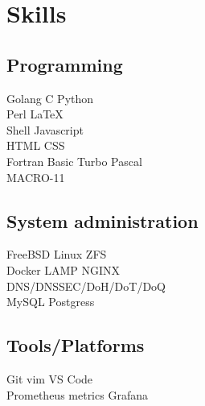 \documentclass[]{schorscv}
\begin{document}
\begin{minipage}[t]{0.25\textwidth} 


\section{Skills}
\subsection{Programming}
\sectionsep
{}
Golang \textbullet{} C \textbullet{} Python \\
\sectionsep
{}
Perl \textbullet{} \LaTeX\  \\
\sectionsep
{}
Shell \textbullet{}  Javascript \\ HTML \textbullet{} CSS \\
\sectionsep
{}
Fortran \textbullet{} Basic \textbullet{} Turbo Pascal \\ MACRO-11 \\
\sectionsep
\sectionsep
\subsection{System administration}
\sectionsep
FreeBSD \textbullet{} Linux \textbullet{} ZFS \\ 
Docker  \textbullet{} LAMP \textbullet{} NGINX \\
DNS/DNSSEC/DoH/DoT/DoQ \\
MySQL  \textbullet{} Postgress \\
\sectionsep
\sectionsep
\subsection{Tools/Platforms}
\sectionsep
Git \textbullet{} vim \textbullet{} VS Code \\
Prometheus metrics \textbullet{} Grafana \\
\sectionsep
\sectionsep



\end{minipage}
\end{document}
